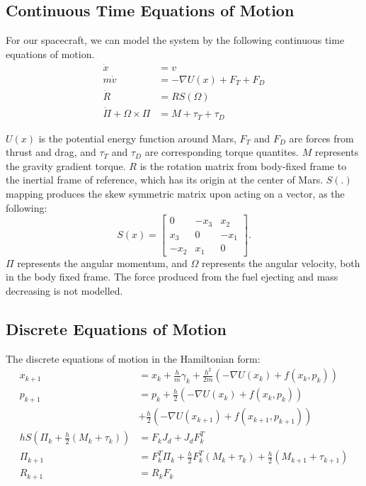 \documentclass[letterpaper, 9 pt, conference]{ieeeconf}
\begin{document}
\subsection{Continuous Time Equations of Motion}
For our spacecraft, we can model the system by the following continuous time equations of motion. 
\begin{equation}
\begin{aligned}
\dot{x} &= v \\
m \dot{v} &= - \nabla U(x) + F_T + F_D \\
\dot{R} &= R S(\Omega) \\
\dot{\Pi} + \Omega \times \Pi &= M + \tau_T + \tau_D
\end{aligned}
\end{equation}

$U(x)$ is the potential energy function around Mars, $F_T$ and $F_D$ are forces 
from thrust and drag, and $\tau_T$ and $\tau_D$ are corresponding torque quantites. 
$M$ represents the gravity gradient torque. 
$R$ is the rotation matrix from body-fixed frame to the inertial frame of reference, which has its origin at the center of Mars.
$S(.)$ mapping produces the skew symmetric matrix upon acting on a vector, as the following: 
\begin{equation}
S(x) = 
\begin{bmatrix}
0 & -x_3 & x_2 \\
x_3 & 0 & -x_1 \\
-x_2 & x_1 & 0
\end{bmatrix}.
\end{equation}
$\Pi$ represents the angular momentum, and $\Omega$ represents the angular velocity, both in the body fixed frame.  
The force produced from the fuel ejecting and mass decreasing is not modelled. 

\subsection{Discrete Equations of Motion}
The discrete equations of motion in the Hamiltonian form: 
\begin{equation}
\begin{aligned}
x_{k+1} &= x_k + \frac{h}{m} \gamma_k + \frac{h^2}{2m} \left( -\nabla U(x_k) + f(x_k, p_k) \right)\\
p_{k+1} &= p_k + \frac{h}{2}  \left( -\nabla U(x_k) + f(x_k, p_k) \right) \\
&+ \frac{h}{2}  \left( -\nabla U(x_{k+1}) + f(x_{k+1}, p_{k+1}) \right) \\
h S(\Pi_k + \frac{h}{2}(M_k + \tau_k)) &= F_k J_d + J_d F_k ^T \\
\Pi_{k+1} &= F_k^T \Pi_k + \frac{h}{2} F_k^T (M_k + \tau_k) + \frac{h}{2} (M_{k+1} + \tau_{k+1}) \\
R_{k+1} &= R_k F_k
\end{aligned}
\end{equation}
\end{document}
